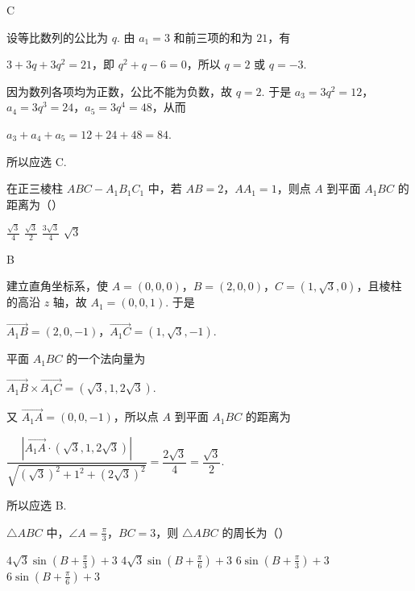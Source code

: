 \begin{answer}
C
\end{answer}

\begin{solution}
设等比数列的公比为 \(q\). 由 \(a_1=3\) 和前三项的和为 \(21\)，有

\(3+3q+3q^2=21\)，即 \(q^2+q-6=0\)，所以 \(q=2\) 或 \(q=-3\).

因为数列各项均为正数，公比不能为负数，故 \(q=2\). 于是 \(a_3=3q^2=12\)，\(a_4=3q^3=24\)，\(a_5=3q^4=48\)，从而

\(a_3+a_4+a_5=12+24+48=84\).

所以应选 C.
\end{solution}

\begin{problem}
在正三棱柱 \(ABC-A_{1}B_{1}C_{1}\) 中，若 \(AB = 2\)，\(AA_{1} = 1\)，则点 \(A\) 到平面 \(A_{1}BC\) 的距离为（\quad）

\choices
    {\(\frac{\sqrt{3}}{4}\)}
    {\(\frac{\sqrt{3}}{2}\)}
    {\(\frac{3\sqrt{3}}{4}\)}
    {\(\sqrt{3}\)}
\end{problem}

\begin{answer}
B
\end{answer}

\begin{solution}
建立直角坐标系，使 \(A=(0,0,0)\)，\(B=(2,0,0)\)，\(C=(1,\sqrt{3},0)\)，且棱柱的高沿 \(z\) 轴，故 \(A_1=(0,0,1)\). 于是

\(\overrightarrow{A_1B}=(2,0,-1)\)，\(\overrightarrow{A_1C}=(1,\sqrt{3},-1)\).

平面 \(A_1BC\) 的一个法向量为

\(\overrightarrow{A_1B}\times\overrightarrow{A_1C}=(\sqrt{3},1,2\sqrt{3})\).

又 \(\overrightarrow{A_1A}=(0,0,-1)\)，所以点 \(A\) 到平面 \(A_1BC\) 的距离为

\(\dfrac{\left|\overrightarrow{A_1A}\cdot(\sqrt{3},1,2\sqrt{3})\right|}{\sqrt{(\sqrt{3})^2+1^2+(2\sqrt{3})^2}}=\dfrac{2\sqrt{3}}{4}=\dfrac{\sqrt{3}}{2}\).

所以应选 B.
\end{solution}

\begin{problem}
\(\triangle ABC\) 中，\(\angle A = \frac{\pi}{3}\)，\(BC = 3\)，则 \(\triangle ABC\) 的周长为（\quad）

\choices
    {\(4\sqrt{3}\sin \left(B + \frac{\pi}{3}\right) + 3\)}
    {\(4\sqrt{3}\sin \left(B + \frac{\pi}{6}\right) + 3\)}
    {\(6\sin \left(B + \frac{\pi}{3}\right) + 3\)}
    {\(6\sin \left(B + \frac{\pi}{6}\right) + 3\)}
\end{problem}


